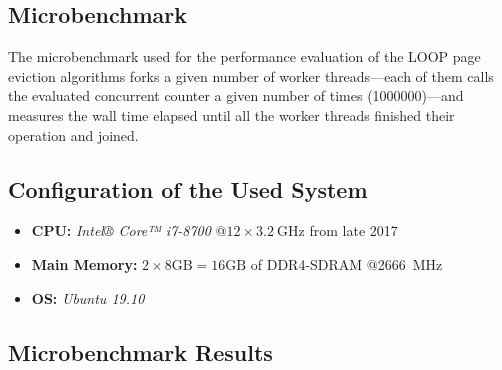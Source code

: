\subsection[Microbenchmark]{Microbenchmark}

    The microbenchmark used for the performance evaluation of the LOOP page eviction algorithms forks a given number of worker threads---each of them calls the evaluated concurrent counter a given number of times (\num{1000000})---and measures the wall time elapsed until all the worker threads finished their operation and joined.

\subsection[System Configuration]{Configuration of the Used System}

\begin{@empty}
    \begin{itemize}
        \itemsep0em
		\item	\textbf{CPU:} \emph{Intel® Core™ i7-8700} @$12 \times \SI{3.2}{\giga\hertz}$ from late 2017
        \item	\textbf{Main Memory:} $2 \times 8\text{GB} = 16\text{GB}$ of DDR4-SDRAM @\SI{2666}{\mega\hertz}
        \item	\textbf{OS:} \emph{Ubuntu 19.10}
    \end{itemize}
\end{@empty}

\subsection[Microbenchmark Results]{Microbenchmark Results} \label{subsec:loop-results}

